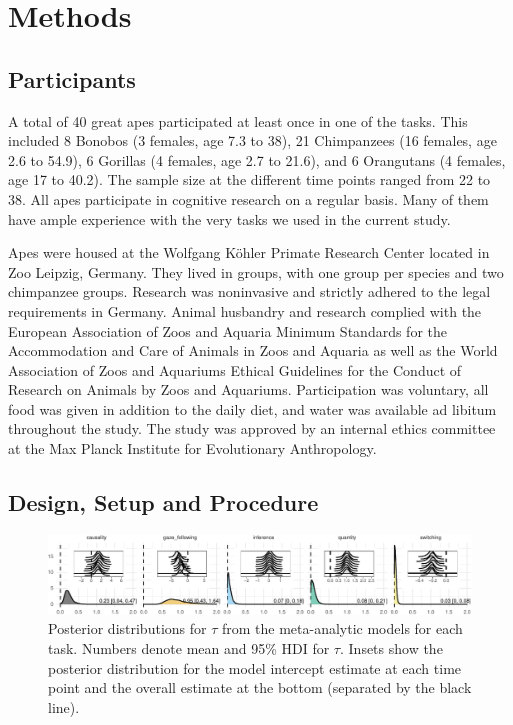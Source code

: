 \documentclass[10pt, letterpaper]{article}
\newenvironment{CodeChunk}{}{}
\begin{document}
\hypertarget{methods}{%
\section{Methods}\label{methods}}

\hypertarget{participants}{%
\subsection{Participants}\label{participants}}

A total of 40 great apes participated at least once in one of the tasks.
This included 8 Bonobos (3 females, age 7.3 to 38), 21 Chimpanzees (16
females, age 2.6 to 54.9), 6 Gorillas (4 females, age 2.7 to 21.6), and
6 Orangutans (4 females, age 17 to 40.2). The sample size at the
different time points ranged from 22 to 38. All apes participate in
cognitive research on a regular basis. Many of them have ample
experience with the very tasks we used in the current study.

Apes were housed at the Wolfgang Köhler Primate Research Center located
in Zoo Leipzig, Germany. They lived in groups, with one group per
species and two chimpanzee groups. Research was noninvasive and strictly
adhered to the legal requirements in Germany. Animal husbandry and
research complied with the European Association of Zoos and Aquaria
Minimum Standards for the Accommodation and Care of Animals in Zoos and
Aquaria as well as the World Association of Zoos and Aquariums Ethical
Guidelines for the Conduct of Research on Animals by Zoos and Aquariums.
Participation was voluntary, all food was given in addition to the daily
diet, and water was available ad libitum throughout the study. The study
was approved by an internal ethics committee at the Max Planck Institute
for Evolutionary Anthropology.

\hypertarget{design-setup-and-procedure}{%
\subsection{Design, Setup and
Procedure}\label{design-setup-and-procedure}}

\begin{CodeChunk}
\begin{figure}[h]

{\centering \includegraphics{figs/metaplot-1} 

}

\caption[Posterior distributions for $\tau$ from the meta-analytic models for each task]{Posterior distributions for $\tau$ from the meta-analytic models for each task. Numbers denote mean and 95\% HDI for $\tau$. Insets show the posterior distribution for the model intercept estimate at each time point and the overall estimate at the bottom (separated by the black line).}\label{fig:metaplot}
\end{figure}
\end{CodeChunk}
\end{document}
